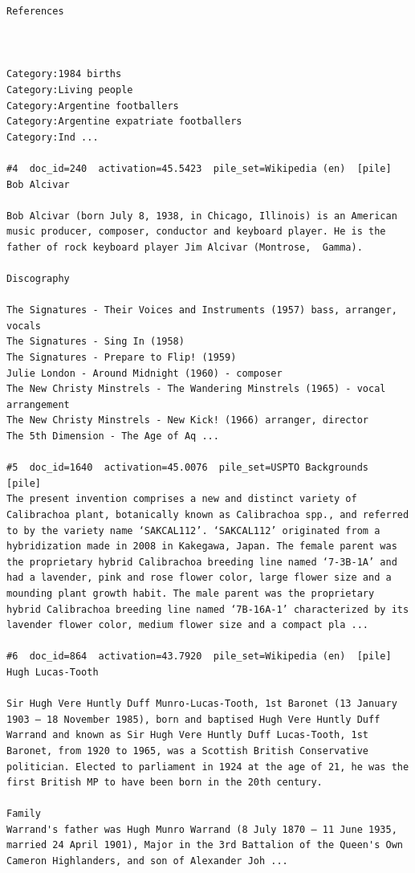\begin{verbatim}
References
 
 

Category:1984 births
Category:Living people
Category:Argentine footballers
Category:Argentine expatriate footballers
Category:Ind ...

#4  doc_id=240  activation=45.5423  pile_set=Wikipedia (en)  [pile]
Bob Alcivar

Bob Alcivar (born July 8, 1938, in Chicago, Illinois) is an American music producer, composer, conductor and keyboard player. He is the father of rock keyboard player Jim Alcivar (Montrose,  Gamma).

Discography

The Signatures - Their Voices and Instruments (1957) bass, arranger, vocals
The Signatures - Sing In (1958)
The Signatures - Prepare to Flip! (1959)
Julie London - Around Midnight (1960) - composer
The New Christy Minstrels - The Wandering Minstrels (1965) - vocal arrangement
The New Christy Minstrels - New Kick! (1966) arranger, director
The 5th Dimension - The Age of Aq ...

#5  doc_id=1640  activation=45.0076  pile_set=USPTO Backgrounds  [pile]
The present invention comprises a new and distinct variety of Calibrachoa plant, botanically known as Calibrachoa spp., and referred to by the variety name ‘SAKCAL112’. ‘SAKCAL112’ originated from a hybridization made in 2008 in Kakegawa, Japan. The female parent was the proprietary hybrid Calibrachoa breeding line named ‘7-3B-1A’ and had a lavender, pink and rose flower color, large flower size and a mounding plant growth habit. The male parent was the proprietary hybrid Calibrachoa breeding line named ‘7B-16A-1’ characterized by its lavender flower color, medium flower size and a compact pla ...

#6  doc_id=864  activation=43.7920  pile_set=Wikipedia (en)  [pile]
Hugh Lucas-Tooth

Sir Hugh Vere Huntly Duff Munro-Lucas-Tooth, 1st Baronet (13 January 1903 – 18 November 1985), born and baptised Hugh Vere Huntly Duff Warrand and known as Sir Hugh Vere Huntly Duff Lucas-Tooth, 1st Baronet, from 1920 to 1965, was a Scottish British Conservative politician. Elected to parliament in 1924 at the age of 21, he was the first British MP to have been born in the 20th century.

Family
Warrand's father was Hugh Munro Warrand (8 July 1870 – 11 June 1935, married 24 April 1901), Major in the 3rd Battalion of the Queen's Own Cameron Highlanders, and son of Alexander Joh ...


\end{verbatim}
